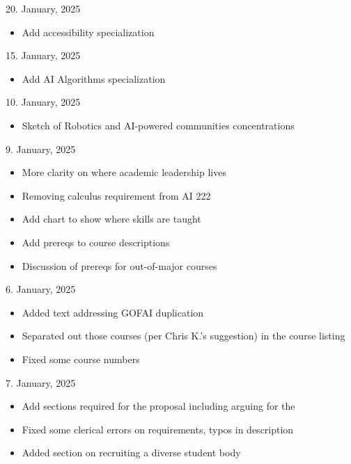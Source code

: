 
20. January, 2025
\begin{itemize}
 \item Add accessibility specialization
\end{itemize}

15. January, 2025
\begin{itemize}
\item Add AI Algorithms specialization
\end{itemize}

10. January, 2025
\begin{itemize}
  \item Sketch of Robotics and AI-powered communities concentrations
\end{itemize}

9. January, 2025

\begin{itemize}
  \item More clarity on where academic leadership lives
  \item Removing calculus requirement from AI 222
  \item Add chart to show where skills are taught
  \item Add prereqs to course descriptions
  \item Discussion of prereqs for out-of-major courses
\end{itemize}

6. January, 2025

\begin{itemize}
    \item Added text addressing GOFAI duplication
    \item Separated out those courses (per Chris K.'s suggestion) in the course listing
    \item Fixed some course numbers
\end{itemize}

7. January, 2025

\begin{itemize}
    \item Add sections required for the  proposal including arguing for the 
    \item Fixed some clerical errors on requirements, typos in description
    \item Added section on recruiting a diverse student body
\end{itemize}